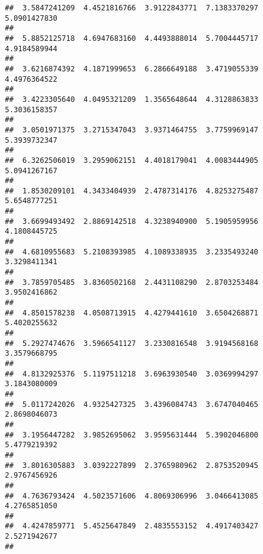 \documentclass[]{article}
\begin{document}
\begin{verbatim}
##  3.5847241209  4.4521816766  3.9122843771  7.1383370297  5.0901427830 
##                                                                       
##  5.8852125718  4.6947683160  4.4493888014  5.7004445717  4.9184589944 
##                                                                       
##  3.6216874392  4.1871999653  6.2866649188  3.4719055339  4.4976364522 
##                                                                       
##  3.4223305640  4.0495321209  1.3565648644  4.3128863833  5.3036158357 
##                                                                       
##  3.0501971375  3.2715347043  3.9371464755  3.7759969147  5.3939732347 
##                                                                       
##  6.3262506019  3.2959062151  4.4018179041  4.0083444905  5.0941267167 
##                                                                       
##  1.8530209101  4.3433404939  2.4787314176  4.8253275487  5.6548777251 
##                                                                       
##  3.6699493492  2.8869142518  4.3238940900  5.1905959956  4.1808445725 
##                                                                       
##  4.6810955683  5.2108393985  4.1089338935  3.2335493240  3.3298411341 
##                                                                       
##  3.7859705485  3.8360502168  2.4431108290  2.8703253484  3.9502416862 
##                                                                       
##  4.8501578238  4.0508713915  4.4279441610  3.6504268871  5.4020255632 
##                                                                       
##  5.2927474676  3.5966541127  3.2330816548  3.9194568168  3.3579668795 
##                                                                       
##  4.8132925376  5.1197511218  3.6963930540  3.0369994297  3.1843080009 
##                                                                       
##  5.0117242026  4.9325427325  3.4396084743  3.6747040465  2.8698046073 
##                                                                       
##  3.1956447282  3.9852695062  3.9595631444  5.3902046800  5.4779219392 
##                                                                       
##  3.8016305883  3.0392227899  2.3765980962  2.8753520945  2.9767456926 
##                                                                       
##  4.7636793424  4.5023571606  4.8069306996  3.0466413085  4.2765851050 
##                                                                       
##  4.4247859771  5.4525647849  2.4835553152  4.4917403427  2.5271942677 
##                                                                       

\end{verbatim}
\end{document}
